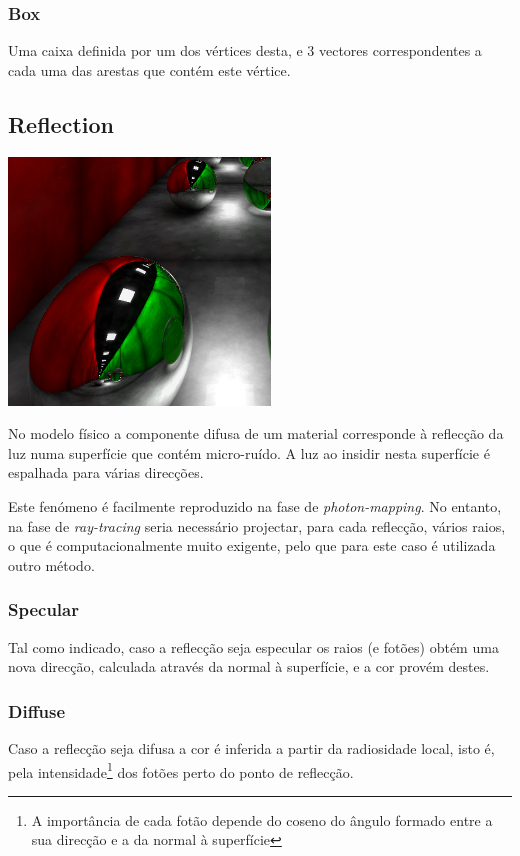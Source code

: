 \documentclass[a4paper]{article}
\begin{document}
\subsubsection{Box}
\indent \indent Uma caixa definida por um dos vértices desta, e 3 vectores correspondentes a cada uma das 
arestas que contém este vértice.

\cleardoublepage
\subsection{Reflection}

\begin{center}
	\includegraphics[scale=0.50]{images/reflection.png}
	\label{fig:reflection}
\end{center}

\indent No modelo físico a componente difusa de um material corresponde à reflecção da luz numa superfície
que contém micro-ruído. A luz ao insidir nesta superfície é espalhada para várias direcções. 

\indent Este fenómeno é facilmente reproduzido na fase de \emph{photon-mapping}.
No entanto, na fase de \emph{ray-tracing} seria necessário projectar, para cada reflecção, vários raios, o que
é computacionalmente muito exigente, pelo que para este caso é utilizada outro método.

\subsubsection{Specular}
\indent \indent Tal como indicado, caso a reflecção seja especular os raios (e fotões) obtém uma nova direcção,
calculada através da normal à superfície, e a cor provém destes. 

\subsubsection{Diffuse}
\indent Caso a reflecção seja difusa a cor é inferida a partir da radiosidade local,
isto é, pela intensidade\footnote[1]{A importância de cada fotão depende do coseno do ângulo formado entre a sua direcção e a da normal à superfície} dos fotões perto do ponto de reflecção.
\end{document}
